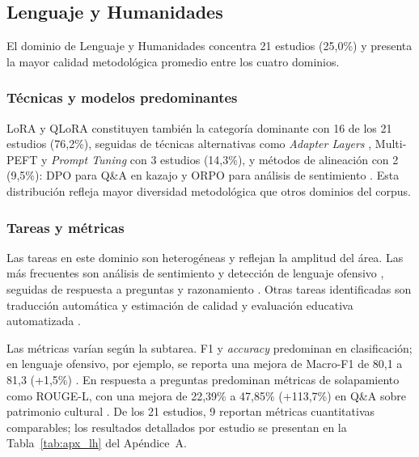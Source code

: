 \subsection{Lenguaje y Humanidades}

El dominio de Lenguaje y Humanidades concentra 21 estudios (25,0\%) y presenta la mayor calidad metodológica promedio entre los cuatro dominios.

\subsubsection{Técnicas y modelos predominantes}

LoRA y QLoRA constituyen también la categoría dominante con 16 de los 21 estudios (76,2\%), seguidas de técnicas alternativas como \textit{Adapter Layers} \parencite{chen2025adaptforever}, Multi-PEFT \parencite{jia2025agnostic} y \textit{Prompt Tuning} \parencite{cheng2025prompt} con 3 estudios (14,3\%), y métodos de alineación con 2 (9,5\%): DPO para Q\&A en kazajo \parencite{kadyrbek2025dpo} y ORPO para análisis de sentimiento \parencite{shen2025ft}. Esta distribución refleja mayor diversidad metodológica que otros dominios del corpus.

\subsubsection{Tareas y métricas}

Las tareas en este dominio son heterogéneas y reflejan la amplitud del área. Las más frecuentes son análisis de sentimiento y detección de lenguaje ofensivo \parencite{shen2025ft, wang2025lora, zain2025ruold, rathore2025ft}, seguidas de respuesta a preguntas y razonamiento \parencite{chen2025ft, li2025keft, cheng2025prompt}. Otras tareas identificadas son traducción automática y estimación de calidad \parencite{khoboko2025ft, sindhujan2025translation} y evaluación educativa automatizada \parencite{anghel2025courseeval}.

Las métricas varían según la subtarea. F1 y \textit{accuracy} predominan en clasificación; en lenguaje ofensivo, por ejemplo, se reporta una mejora de Macro-F1 de 80,1 a 81,3 (+1,5\%) \parencite{wang2025lora}. En respuesta a preguntas predominan métricas de solapamiento como ROUGE-L, con una mejora de 22,39\% a 47,85\% (+113,7\%) en Q\&A sobre patrimonio cultural \parencite{chen2025ft}. De los 21 estudios, 9 reportan métricas cuantitativas comparables; los resultados detallados por estudio se presentan en la Tabla~\ref{tab:apx_lh} del Apéndice~A.

